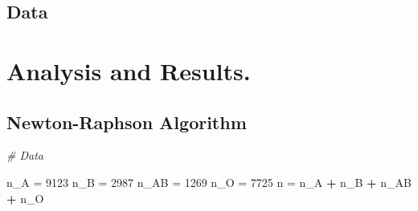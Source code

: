 \documentclass[]{article}
\newenvironment{Shaded}{\begin{snugshade}}{\end{snugshade}}
\newcommand{\DecValTok}[1]{\textcolor[rgb]{0.00,0.00,0.81}{#1}}
\newcommand{\StringTok}[1]{\textcolor[rgb]{0.31,0.60,0.02}{#1}}
\newcommand{\CommentTok}[1]{\textcolor[rgb]{0.56,0.35,0.01}{\textit{#1}}}
\newcommand{\OperatorTok}[1]{\textcolor[rgb]{0.81,0.36,0.00}{\textbf{#1}}}
\newcommand{\NormalTok}[1]{#1}
\begin{document}
\subsection{Data}\label{data}

\section{Analysis and Results.}\label{analysis-and-results.}

\subsection{Newton-Raphson Algorithm}\label{newton-raphson-algorithm}

\begin{Shaded}
\begin{Highlighting}[]
\CommentTok{# Data}

\NormalTok{n_A =}\StringTok{ }\DecValTok{9123}
\NormalTok{n_B =}\StringTok{ }\DecValTok{2987}
\NormalTok{n_AB =}\StringTok{ }\DecValTok{1269}
\NormalTok{n_O =}\StringTok{ }\DecValTok{7725}
\NormalTok{n =}\StringTok{ }\NormalTok{n_A }\OperatorTok{+}\StringTok{ }\NormalTok{n_B }\OperatorTok{+}\StringTok{ }\NormalTok{n_AB }\OperatorTok{+}\StringTok{ }\NormalTok{n_O}
\end{Highlighting}
\end{Shaded}
\end{document}
